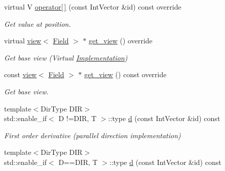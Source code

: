 \begin{DoxyCompactItemize}
virtual V \hyperlink{classUintah_1_1PhaseField_1_1detail_1_1bc__fd_3_01ScalarField_3_01T_01_4_00_01STN_00_01CC_00_01F_00_01BC_1_1Neumann_00_011_01_4_ab867f0e9a7da24159768755a1fdbe659}{operator\mbox{[}$\,$\mbox{]}} (const Int\+Vector \&id) const override
\begin{DoxyCompactList}\small\item\em Get value at position. \end{DoxyCompactList}\item 
virtual \hyperlink{classUintah_1_1PhaseField_1_1detail_1_1view}{view}$<$ \hyperlink{structUintah_1_1PhaseField_1_1ScalarField}{Field} $>$ $\ast$ \hyperlink{classUintah_1_1PhaseField_1_1detail_1_1bc__fd_3_01ScalarField_3_01T_01_4_00_01STN_00_01CC_00_01F_00_01BC_1_1Neumann_00_011_01_4_ae067158c4bde7162f906999a1eb7c4e8}{get\+\_\+view} () override
\begin{DoxyCompactList}\small\item\em Get base view (Virtual \hyperlink{classUintah_1_1PhaseField_1_1Implementation}{Implementation}) \end{DoxyCompactList}\item 
const \hyperlink{classUintah_1_1PhaseField_1_1detail_1_1view}{view}$<$ \hyperlink{structUintah_1_1PhaseField_1_1ScalarField}{Field} $>$ $\ast$ \hyperlink{classUintah_1_1PhaseField_1_1detail_1_1bc__fd_3_01ScalarField_3_01T_01_4_00_01STN_00_01CC_00_01F_00_01BC_1_1Neumann_00_011_01_4_a158cefd68ffdfd59e5590b850c7ca78f}{get\+\_\+view} () const override
\begin{DoxyCompactList}\small\item\em Get base view. \end{DoxyCompactList}\item 
{\footnotesize template$<$Dir\+Type D\+IR$>$ }\\std\+::enable\+\_\+if$<$ D !=D\+IR, T $>$\+::type \hyperlink{classUintah_1_1PhaseField_1_1detail_1_1bc__fd_3_01ScalarField_3_01T_01_4_00_01STN_00_01CC_00_01F_00_01BC_1_1Neumann_00_011_01_4_a0aa06e97cc6a71b85517cbf3f2145c5d}{d} (const Int\+Vector \&id) const
\begin{DoxyCompactList}\small\item\em First order derivative (parallel direction implementation) \end{DoxyCompactList}\item 
{\footnotesize template$<$Dir\+Type D\+IR$>$ }\\std\+::enable\+\_\+if$<$ D==D\+IR, T $>$\+::type \hyperlink{classUintah_1_1PhaseField_1_1detail_1_1bc__fd_3_01ScalarField_3_01T_01_4_00_01STN_00_01CC_00_01F_00_01BC_1_1Neumann_00_011_01_4_a196717da3f3852b13f554ab51c510a44}{d} (const Int\+Vector \&id) const

\end{DoxyCompactItemize}
